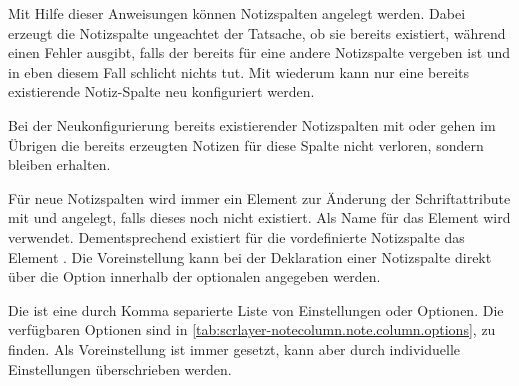 \begin{Declaration}
\end{Declaration}
Mit Hilfe dieser Anweisungen können Notizspalten angelegt werden. Dabei
erzeugt  die Notizspalte ungeachtet der Tatsache, ob
sie bereits existiert, während  einen
Fehler ausgibt, falls der  bereits für eine andere
Notizspalte vergeben ist und  in eben diesem Fall
schlicht nichts tut. Mit  wiederum kann nur eine
bereits existierende Notiz-Spalte neu konfiguriert werden.

Bei der Neukonfigurierung bereits existierender Notizspalten mit
 oder  gehen im Übrigen
die bereits erzeugten Notizen für diese Spalte nicht verloren, sondern bleiben
erhalten.

%
%
Für neue Notizspalten wird immer ein Element zur Änderung der Schriftattribute
mit  und  angelegt,
falls dieses noch nicht existiert. Als Name für das Element wird
 verwendet. Dementsprechend
existiert für die vordefinierte Notizspalte  das
Element . Die
Voreinstellung kann bei der Deklaration einer Notizspalte direkt über die
Option  innerhalb der optionalen 
angegeben werden.%
%
%

Die  ist eine durch Komma separierte Liste von
Einstellungen oder Optionen. Die verfügbaren Optionen sind in
\autoref{tab:scrlayer-notecolumn.note.column.options},
 zu
finden. Als Voreinstellung
ist  immer gesetzt, kann aber durch individuelle
Einstellungen überschrieben werden.

